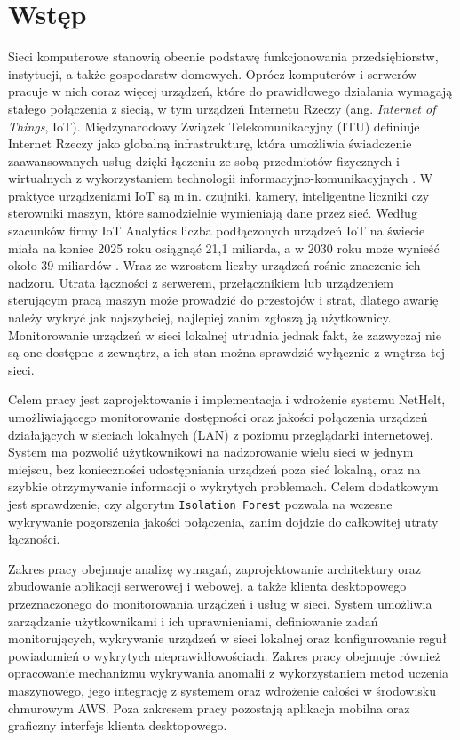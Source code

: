 \chapter*{Wstęp}

Sieci komputerowe stanowią obecnie podstawę funkcjonowania przedsiębiorstw, instytucji, a także gospodarstw domowych. Oprócz komputerów i serwerów pracuje w nich coraz więcej urządzeń, które do prawidłowego działania wymagają stałego połączenia z siecią, w tym urządzeń Internetu Rzeczy (ang. \emph{Internet of Things}, IoT). Międzynarodowy Związek Telekomunikacyjny (ITU) definiuje Internet Rzeczy jako globalną infrastrukturę, która umożliwia świadczenie zaawansowanych usług dzięki łączeniu ze sobą przedmiotów fizycznych i wirtualnych z wykorzystaniem technologii informacyjno-komunikacyjnych \cite{www1}. W praktyce urządzeniami IoT są m.in. czujniki, kamery, inteligentne liczniki czy sterowniki maszyn, które samodzielnie wymieniają dane przez sieć. Według szacunków firmy IoT Analytics liczba podłączonych urządzeń IoT na świecie miała na koniec 2025 roku osiągnąć 21,1 miliarda, a w 2030 roku może wynieść około 39 miliardów \cite{www2}. Wraz ze wzrostem liczby urządzeń rośnie znaczenie ich nadzoru. Utrata łączności z serwerem, przełącznikiem lub urządzeniem sterującym pracą maszyn może prowadzić do przestojów i strat, dlatego awarię należy wykryć jak najszybciej, najlepiej zanim zgłoszą ją użytkownicy. Monitorowanie urządzeń w sieci lokalnej utrudnia jednak fakt, że zazwyczaj nie są one dostępne z zewnątrz, a ich stan można sprawdzić wyłącznie z wnętrza tej sieci.

Celem pracy jest zaprojektowanie i implementacja i wdrożenie systemu NetHelt, umożliwiającego monitorowanie dostępności oraz jakości połączenia urządzeń działających w sieciach lokalnych (LAN) z poziomu przeglądarki internetowej. System ma pozwolić użytkownikowi na nadzorowanie wielu sieci w jednym miejscu, bez konieczności udostępniania urządzeń poza sieć lokalną, oraz na szybkie otrzymywanie informacji o wykrytych problemach. Celem dodatkowym jest sprawdzenie, czy algorytm \texttt{Isolation Forest} pozwala na wczesne wykrywanie pogorszenia jakości połączenia, zanim dojdzie do całkowitej utraty łączności.

Zakres pracy obejmuje analizę wymagań, zaprojektowanie architektury oraz zbudowanie aplikacji serwerowej i webowej, a także klienta desktopowego przeznaczonego do monitorowania urządzeń i usług w sieci. System umożliwia zarządzanie użytkownikami i ich uprawnieniami, definiowanie zadań monitorujących, wykrywanie urządzeń w sieci lokalnej oraz konfigurowanie reguł powiadomień o wykrytych nieprawidłowościach. Zakres pracy obejmuje również opracowanie mechanizmu wykrywania anomalii z wykorzystaniem metod uczenia maszynowego, jego integrację z systemem oraz wdrożenie całości w środowisku chmurowym AWS. Poza zakresem pracy pozostają aplikacja mobilna oraz graficzny interfejs klienta desktopowego.

